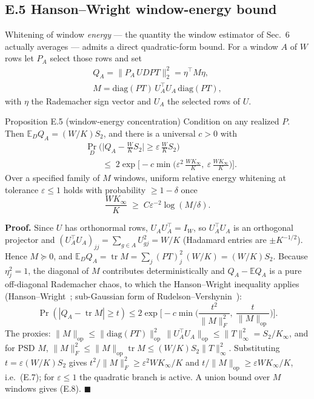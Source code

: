 \subsection{E.5 Hanson--Wright window-energy bound}

Whitening of window \emph{energy} --- the quantity the window estimator of Sec.~6 actually averages --- admits a direct quadratic-form bound. For a window $A$ of $W$ rows let $P_A$ select those rows and set
\[
\begin{gathered}
Q_A=\|P_A\,U D P T\|_2^2=\eta^\top M\eta,\\
M=\mathrm{diag}(PT)\,U_A^\top U_A\,\mathrm{diag}(PT),
\end{gathered}
\]
with $\eta$ the Rademacher sign vector and $U_A$ the selected rows of $U$.

\begin{namedthm}{Proposition E.5 (window-energy concentration)}
Condition on any realized $P$. Then $\mathbb{E}_DQ_A=(W/K)S_2$, and there is a universal $c>0$ with
\begin{equation}
\begin{aligned}
&\Pr_D\!\Big(\big|Q_A-\tfrac{W}{K}S_2\big|\ge\varepsilon\,\tfrac{W}{K}S_2\Big)\\
&\qquad\le\;2\exp\!\Big[-c\min\Big(\varepsilon^2\,\tfrac{WK_\infty}{K},\ \varepsilon\,\tfrac{WK_\infty}{K}\Big)\Big].
\end{aligned}
\tag{E.7}
\end{equation}
Over a specified family of $M$ windows, uniform relative energy whitening at tolerance $\varepsilon\le1$ holds with probability $\ge1-\delta$ once
\begin{equation}
\frac{WK_\infty}{K}\;\ge\;C\varepsilon^{-2}\log(M/\delta). \tag{E.8}
\end{equation}
\end{namedthm}

\noindent\textbf{Proof.} Since $U$ has orthonormal rows, $U_AU_A^\top=I_W$, so $U_A^\top U_A$ is an orthogonal projector and $(U_A^\top U_A)_{jj}=\sum_{g\in A}U_{gj}^2=W/K$ (Hadamard entries are $\pm K^{-1/2}$). Hence $M\succeq0$, and $\mathbb{E}_DQ_A=\operatorname{tr}M=\sum_j(PT)_j^2\,(W/K)=(W/K)S_2$. Because $\eta_j^2=1$, the diagonal of $M$ contributes deterministically and $Q_A-\mathbb{E}Q_A$ is a pure off-diagonal Rademacher chaos, to which the Hanson--Wright inequality applies (Hanson--Wright~\cite{HansonWright1971}; sub-Gaussian form of Rudelson--Vershynin~\cite{RudelsonVershynin2013}):
\[
\Pr(|Q_A-\operatorname{tr}M|\ge t)\le2\exp\Big[-c\min\Big(\frac{t^2}{\|M\|_F^2},\ \frac{t}{\|M\|_{\mathrm{op}}}\Big)\Big].
\]
The proxies: $\|M\|_{\mathrm{op}}\le\|\mathrm{diag}(PT)\|_{\mathrm{op}}^2\,\|U_A^\top U_A\|_{\mathrm{op}}\le\|T\|_\infty^2=S_2/K_\infty$, and for PSD $M$, $\|M\|_F^2\le\|M\|_{\mathrm{op}}\operatorname{tr}M\le(W/K)S_2\|T\|_\infty^2$. Substituting $t=\varepsilon(W/K)S_2$ gives $t^2/\|M\|_F^2\ge\varepsilon^2WK_\infty/K$ and $t/\|M\|_{\mathrm{op}}\ge\varepsilon WK_\infty/K$, i.e.\ (E.7); for $\varepsilon\le1$ the quadratic branch is active. A union bound over $M$ windows gives (E.8). \hfill$\blacksquare$

